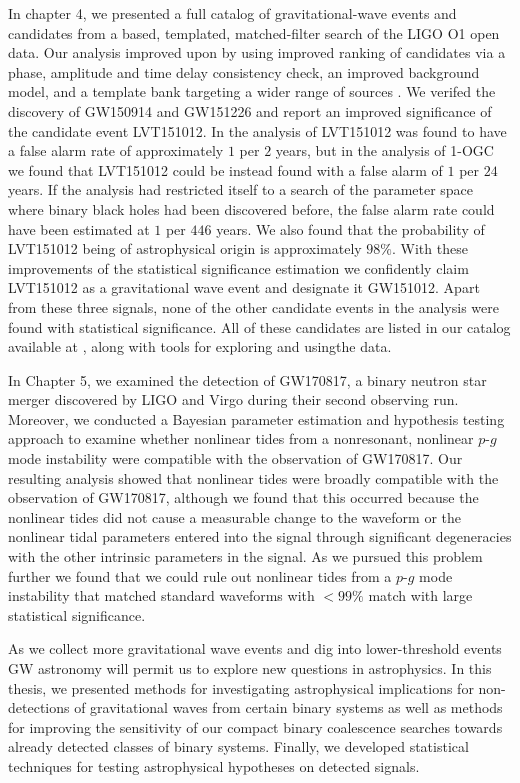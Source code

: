 
In chapter 4, we presented a full catalog of gravitational-wave events and candidates from a \pycbc{}\-based, templated, matched-filter search of the LIGO O1 open data. Our analysis improved upon \cite{TheLIGOScientific:2016pea,Abbott:2016ymx} by using improved ranking of candidates via a phase, amplitude and time delay consistency check, an improved background model, and a template bank targeting a wider range of sources \citep{Nitz:2017svb, Nitz:2017lco,DalCanton:2017ala}. We verifed the discovery of GW150914 and GW151226 and report an improved significance of the candidate event LVT151012. In the analysis of \cite{TheLIGOScientific:2016pea,Abbott:2016ymx} LVT151012 was found to have a false alarm rate of approximately $1$ per $2$ years, but in the analysis of 1-OGC we found that LVT151012 could be instead found with a false alarm of $1$ per $24$ years. If the analysis had restricted itself to a search of the parameter space where binary black holes had been discovered before, the false alarm rate could have been estimated at $1$ per $446$ years. We also found that the probability of LVT151012 being of astrophysical origin is approximately $98 \%$. With these improvements of the statistical significance estimation we confidently claim LVT151012 as a gravitational wave event and designate it GW151012. Apart from these three signals, none of the other candidate events in the analysis were found with statistical significance. All of these candidates are listed in our catalog available at \release{}, along with tools for exploring and usingthe data.


In Chapter 5, we examined the detection of GW170817, a binary neutron star merger discovered by LIGO and Virgo during their second observing run. Moreover, we conducted a Bayesian parameter estimation and hypothesis testing approach to examine whether nonlinear tides from a nonresonant, nonlinear $p$-$g$ mode instability were compatible with the observation of GW170817. Our resulting analysis showed that nonlinear tides were broadly compatible with the observation of GW170817, although we found that this occurred because the nonlinear tides did not cause a measurable change to the waveform or the nonlinear tidal parameters entered into the signal through significant degeneracies with the other intrinsic parameters in the signal. As we pursued this problem further we found that we could rule out nonlinear tides from a $p$-$g$ mode instability that matched standard waveforms with $< 99 \%$ match with large statistical significance.

As we collect more gravitational wave events and dig into lower-threshold events GW astronomy will permit us to explore new questions in astrophysics. In this thesis, we presented methods for investigating astrophysical implications for non-detections of gravitational waves from certain binary systems as well as methods for improving the sensitivity of our compact binary coalescence searches towards already detected classes of binary systems. Finally, we developed statistical techniques for testing astrophysical hypotheses on detected signals.
